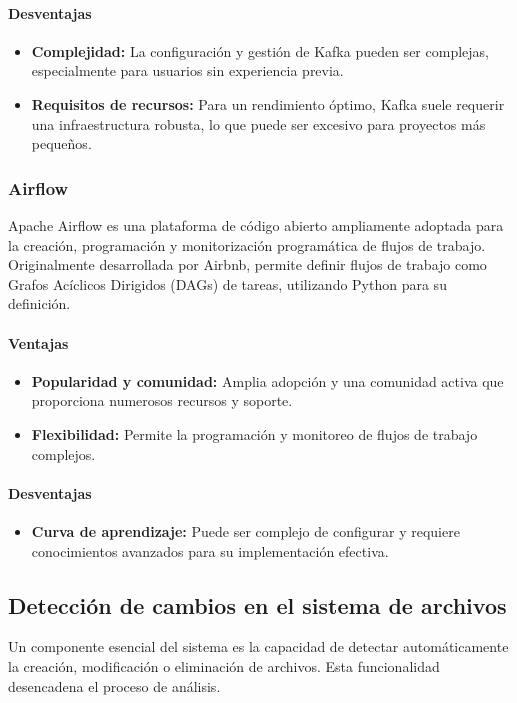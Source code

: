 \paragraph{Desventajas}
\begin{itemize}
\item \textbf{Complejidad:} La configuración y gestión de Kafka pueden ser complejas, especialmente para usuarios sin experiencia previa.
\item \textbf{Requisitos de recursos:} Para un rendimiento óptimo, Kafka suele requerir una infraestructura robusta, lo que puede ser excesivo para proyectos más pequeños.
\end{itemize}

\subsubsection{Airflow}
Apache Airflow es una plataforma de código abierto ampliamente adoptada para la creación, programación y monitorización programática de flujos de trabajo. Originalmente desarrollada por Airbnb, permite definir flujos de trabajo como Grafos Acíclicos Dirigidos (DAGs) de tareas, utilizando Python para su definición.

\paragraph{Ventajas}
\begin{itemize}
\item \textbf{Popularidad y comunidad:} Amplia adopción y una comunidad activa que proporciona numerosos recursos y soporte.
\item \textbf{Flexibilidad:} Permite la programación y monitoreo de flujos de trabajo complejos.
\end{itemize}

\paragraph{Desventajas}
\begin{itemize}
\item \textbf{Curva de aprendizaje:} Puede ser complejo de configurar y requiere conocimientos avanzados para su implementación efectiva.
\end{itemize}

\subsection{Detección de cambios en el sistema de archivos}
Un componente esencial del sistema es la capacidad de detectar automáticamente la creación, modificación o eliminación de archivos. Esta funcionalidad desencadena el proceso de análisis.

